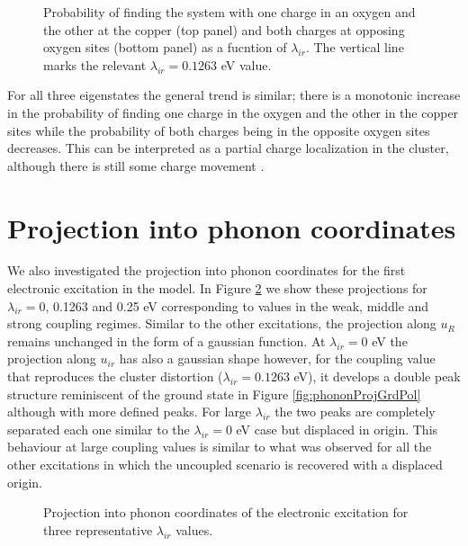 \begin{figure}[ht]
  \centering
  
  \caption[Probability of finding the system with one charge in an oxygen and the other at the copper and both charges at opposing oxygen sites.]
  {Probability of finding the system with one charge in an oxygen and the other at the copper (top panel) and both charges at opposing oxygen sites (bottom panel) as a fucntion of $\lambda_{ir}$.
  The vertical line marks the relevant $\lambda_{ir}=0.1263$ eV value.}
  \label{fig:electronicOccupations}
\end{figure}

For all three eigenstates the general trend is similar; there is a monotonic increase in the probability of finding one charge in the oxygen and the other in the copper sites while the probability of both charges being in the opposite oxygen sites decreases.
This can be interpreted as a partial charge localization in the cluster, although there is still some charge movement \cite{GarciaSaraviaOrtizdeMontellano2013}.

\section{Projection into phonon coordinates}
\label{sec:elPhononProj}

We also investigated the projection into phonon coordinates for the first electronic excitation in the model.
In Figure \ref{fig:phononProjElectr} we show these projections for $\lambda_{ir}=$0, 0.1263 and 0.25 eV corresponding to values in the weak, middle and strong coupling regimes.
Similar to the other excitations, the projection along $u_R$ remains unchanged in the form of a gaussian function.
At $\lambda_{ir}=0$ eV the projection along $u_{ir}$ has also a gaussian shape however, for the coupling value that reproduces the cluster distortion ($\lambda_{ir}=0.1263$ eV), it develops a double peak structure reminiscent of the ground state in Figure \ref{fig:phononProjGrdPol} although with more defined peaks.
For large $\lambda_{ir}$ the two peaks are completely separated each one similar to the $\lambda_{ir}=0$ eV case but displaced in origin.
This behaviour at large coupling values is similar to what was observed for all the other excitations in which the uncoupled scenario is recovered with a displaced origin.

\begin{figure}[ht]
  \centering
  
  \caption[Projection into phonon coordinates of the electronic excitation.]
  {Projection into phonon coordinates of the electronic excitation for three representative $\lambda_{ir}$ values.}
  \label{fig:phononProjElectr}
\end{figure}

